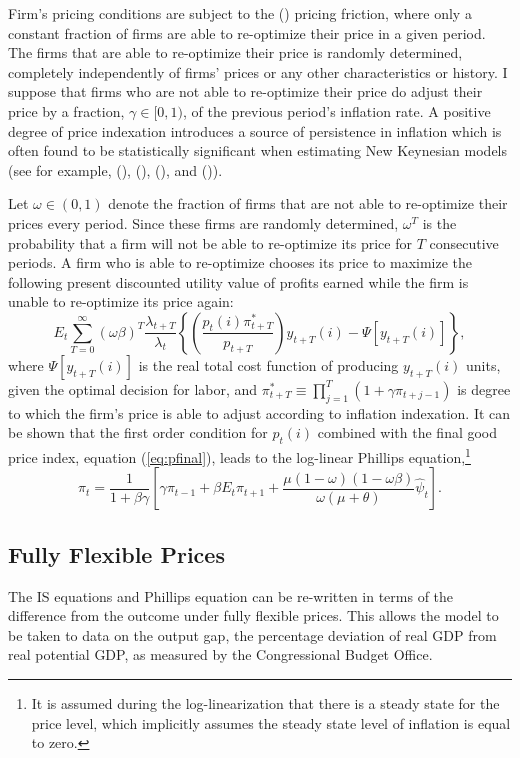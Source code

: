 \documentclass[10pt]{article}
\newcommand{\beq}{\begin{equation}}
\newcommand{\eeq}{\end{equation}}
\newcommand{\citee}[1]{\citeauthor*{#1} (\citeyear{#1})}
\newcommand{\h}[1]{\hat{#1}}
\begin{document}
Firm's pricing conditions are subject to the \citee{calvo1983} pricing friction, where only a constant fraction of firms are able to re-optimize their price in a given period.  The firms that are able to re-optimize their price is randomly determined, completely independently of firms' prices or any other characteristics or history.  I suppose that firms who are not able to re-optimize their price do adjust their price by a fraction, $\gamma \in [0,1)$, of the previous period's inflation rate.  A positive degree of price indexation introduces a source of persistence in inflation which is often found to be statistically significant when estimating New Keynesian models (see for example, \citeauthor*{smetswouters2005} (\citeyear{smetswouters2003}), (\citeyear{smetswouters2005}), (\citeyear{smetswouters2007}), and \citee{milani2007}).

Let $\omega \in (0,1)$ denote the fraction of firms that are not able to re-optimize their prices every period.  Since these firms are randomly determined, $\omega^T$ is the probability that a firm will not be able to re-optimize its price for $T$ consecutive periods.  A firm who is able to re-optimize chooses its price to maximize the following present discounted utility value of profits earned while the firm is unable to re-optimize its price again: 
\beq \label{eq:intprofit}
E_t \sum_{T=0}^{\infty} \left(\omega \beta \right)^{T} \frac{\lambda_{t+T}}{\lambda_t}
\left\{ \left(\frac{p_{t}(i) \pi_{t+T}^{*}}{p_{t+T}}\right) y_{t+T}(i) - \Psi\left[y_{t+T}(i)\right] \right\},
\eeq
where $\Psi\left[y_{t+T}(i)\right]$ is the real total cost function of producing $y_{t+T}(i)$ units, given the optimal decision for labor, and $\pi_{t+T}^{*} \equiv \prod_{j=1}^{T} (1+\gamma \pi_{t+j-1})$ is degree to which the firm's price is able to adjust according to inflation indexation.  It can be shown that the first order condition for $p_{t}(i)$ combined with the final good price index, equation (\ref{eq:pfinal}), leads to the log-linear Phillips equation,\footnote{It is assumed during the log-linearization that there is a steady state for the price level, which implicitly assumes the steady state level of inflation is equal to zero.}
\beq \label{eq:phillips} \pi_t = \frac{1}{1+\beta \gamma} \left[ \gamma \pi_{t-1} + \beta E_t \pi_{t+1} + \frac{\mu (1-\omega)(1-\omega \beta)}{\omega (\mu + \theta)} \h{\psi}_t \right]. \eeq

\subsection{Fully Flexible Prices}
The IS equations and Phillips equation can be re-written in terms of the difference from the outcome under fully flexible prices.  This allows the model to be taken to data on the output gap, the percentage deviation of real GDP from real potential GDP, as measured by the Congressional Budget Office.  
\end{document}
